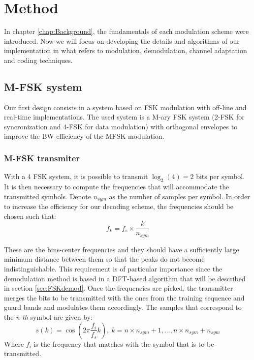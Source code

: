 \documentclass[12pt,a4paper,openright]{report}
\begin{document}
 


\chapter{Method}

In chapter \ref{chap:Background}, the fundamentals of each modulation scheme were introduced. Now we will focus on developing the details and algorithms of our implementation in what refers to modulation, demodulation, channel adaptation and coding techniques. 

\section{M-FSK system}

Our first design consists in a system based on FSK modulation with off-line and real-time implementations. The used system is a M-ary FSK system (2-FSK for syncronization and 4-FSK for data modulation) with orthogonal envelopes to improve the BW efficiency of the MFSK modulation. 

\subsection{M-FSK transmiter}

With a 4 FSK system, it is possible to transmit $\log_2(4)=2$ bits per symbol. It is then necessary to compute the frequencies that will accommodate the transmitted symbols. Denote $n_{sym}$ as the number of samples per symbol. In order to increase the efficiency for our decoding scheme, the frequencies should be chosen such that:
\begin{equation}
f_k=f_s \times \frac{k}{n_{sym}}
\end{equation}

These are the bins-center frequencies and they should have a sufficiently large minimum distance between them so that the peaks do not become indistinguishable. This requirement is of particular importance since the demodulation method is based in a DFT-based algorithm that will be described in section \ref{sec:FSKdemod}. %
Once the frequencies are picked, the transmitter merges the bits to be transmitted with the ones from the training sequence and guard bands and modulates them accordingly. The samples that correspond to the \emph{n-th} symbol are given by:
\begin{equation}
s(k) = \cos{(2\pi \frac{ f_i}{f_s} k)}, \ k=n\times n_{sym} +1, ... , n \times n_{sym}+n_{sym}
\end{equation}
Where $f_i$ is the frequency that matches with the symbol that is to be transmitted.
 
\end{document}
